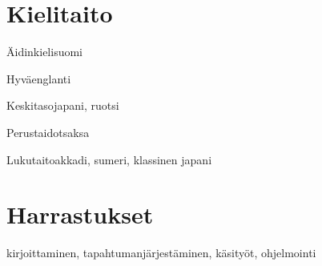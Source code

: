 \documentclass{tccv_fin}
\begin{document}
\section{Kielitaito}

\begin{factlist}
\item{Äidinkieli}{suomi}
\item{Hyvä}{englanti}
\item{Keskitaso}{japani, ruotsi}
\item{Perustaidot}{saksa}
\item{Lukutaito}{akkadi, sumeri, klassinen japani}
\end{factlist}

\section{Harrastukset}
\begin{factlist}
\item{}
     {kirjoittaminen, tapahtumanjärjestäminen, käsityöt, ohjelmointi}
\end{factlist}
\end{document}
